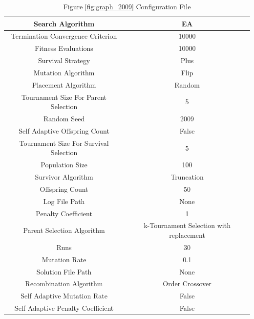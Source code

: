 \documentclass{standalone}
\begin{document}
\begin{table}[!htb]
	\centering
	\caption{Figure \ref{fig:graph_2009} Configuration File}
	\label{tab:graph_2009}
	\begin{tabular}{| c | c |}
		\hline
		Search Algorithm		& EA		 \\
		\hline
		Termination Convergence Criterion		& 10000		 \\
		\hline
		Fitness Evaluations		& 10000		 \\
		\hline
		Survival Strategy		& Plus		 \\
		\hline
		Mutation Algorithm		& Flip		 \\
		\hline
		Placement Algorithm		& Random		 \\
		\hline
		Tournament Size For Parent Selection		& 5		 \\
		\hline
		Random Seed		& 2009		 \\
		\hline
		Self Adaptive Offspring Count		& False		 \\
		\hline
		Tournament Size For Survival Selection		& 5		 \\
		\hline
		Population Size		& 100		 \\
		\hline
		Survivor Algorithm		& Truncation		 \\
		\hline
		Offspring Count		& 50		 \\
		\hline
		Log File Path		& None		 \\
		\hline
		Penalty Coefficient		& 1		 \\
		\hline
		Parent Selection Algorithm		& k-Tournament Selection with replacement		 \\
		\hline
		Runs		& 30		 \\
		\hline
		Mutation Rate		& 0.1		 \\
		\hline
		Solution File Path		& None		 \\
		\hline
		Recombination Algorithm		& Order Crossover		 \\
		\hline
		Self Adaptive Mutation Rate		& False		 \\
		\hline
		Self Adaptive Penalty Coefficient		& False		 \\
		\hline
	\end{tabular}
\end{table}
\end{document}
